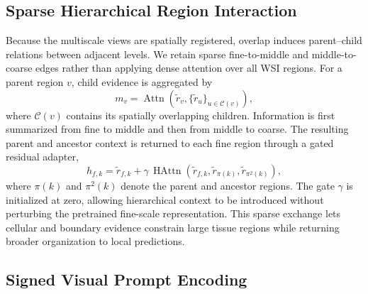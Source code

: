 \documentclass[letterpaper]{article} %
\begin{document}
\subsection{Sparse Hierarchical Region Interaction}

Because the multiscale views are spatially registered, overlap induces parent--child relations between adjacent levels. We retain sparse fine-to-middle and middle-to-coarse edges rather than applying dense attention over all WSI regions. For a parent region $v$, child evidence is aggregated by
\begin{equation}
    m_v = \operatorname{Attn}\!\left(
    \tilde{r}_v,
    \{\tilde{r}_u\}_{u\in\mathcal{C}(v)}
    \right),
\end{equation}
where $\mathcal{C}(v)$ contains its spatially overlapping children. Information is first summarized from fine to middle and then from middle to coarse. The resulting parent and ancestor context is returned to each fine region through a gated residual adapter,
\begin{equation}
    h_{f,k}=\tilde{r}_{f,k}
    +\gamma\,\operatorname{HAttn}\!\left(
    \tilde{r}_{f,k},\tilde{r}_{\pi(k)},\tilde{r}_{\pi^2(k)}
    \right),
\end{equation}
where $\pi(k)$ and $\pi^2(k)$ denote the parent and ancestor regions. The gate $\gamma$ is initialized at zero, allowing hierarchical context to be introduced without perturbing the pretrained fine-scale representation. This sparse exchange lets cellular and boundary evidence constrain large tissue regions while returning broader organization to local predictions.

\subsection{Signed Visual Prompt Encoding}
\end{document}
